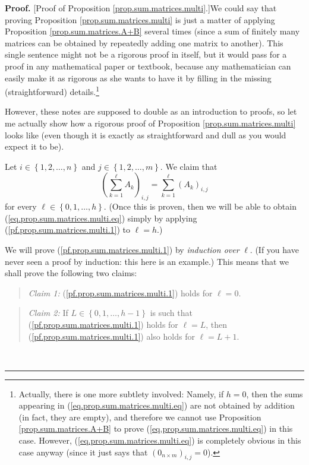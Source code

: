 \documentclass[numbers=enddot,12pt,final,onecolumn,notitlepage]{scrartcl}%
\theoremstyle{definition}
\newenvironment{statement}{\begin{quote}}{\end{quote}}
\newenvironment{proof}[1][Proof]{\noindent\textbf{#1.} }{\ \rule{0.5em}{0.5em}}
\let\sumnonlimits\sum
\renewcommand{\sum}{\sumnonlimits\limits}
\begin{document}
\begin{proof}
[Proof of Proposition \ref{prop.sum.matrices.multi}.]We could say that proving
Proposition \ref{prop.sum.matrices.multi} is just a matter of applying
Proposition \ref{prop.sum.matrices.A+B} several times (since a sum of finitely
many matrices can be obtained by repeatedly adding one matrix to another).
This single sentence might not be a rigorous proof in itself, but it would
pass for a proof in any mathematical paper or textbook, because any
mathematician can easily make it as rigorous as she wants to have it by
filling in the missing (straightforward) details.\footnote{Actually, there is
one more subtlety involved: Namely, if $h=0$, then the sums appearing in
(\ref{eq.prop.sum.matrices.multi.eq}) are not obtained by addition (in fact,
they are empty), and therefore we cannot use Proposition
\ref{prop.sum.matrices.A+B} to prove (\ref{eq.prop.sum.matrices.multi.eq}) in
this case. However, (\ref{eq.prop.sum.matrices.multi.eq}) is completely
obvious in this case anyway (since it just says that $\left(  0_{n\times
m}\right)  _{i,j}=0$).}

However, these notes are supposed to double as an introduction to proofs, so
let me actually show how a rigorous proof of Proposition
\ref{prop.sum.matrices.multi} looks like (even though it is exactly as
straightforward and dull as you would expect it to be).

Let $i\in\left\{  1,2,\ldots,n\right\}  $ and $j\in\left\{  1,2,\ldots
,m\right\}  $. We claim that%
\begin{equation}
\left(  \sum_{k=1}^{\ell}A_{k}\right)  _{i,j}=\sum_{k=1}^{\ell}\left(
A_{k}\right)  _{i,j} \label{pf.prop.sum.matrices.multi.1}%
\end{equation}
for every $\ell\in\left\{  0,1,\ldots,h\right\}  $. (Once this is proven, then
we will be able to obtain (\ref{eq.prop.sum.matrices.multi.eq}) simply by
applying (\ref{pf.prop.sum.matrices.multi.1}) to $\ell=h$.)

We will prove (\ref{pf.prop.sum.matrices.multi.1}) by \textit{induction over
}$\ell$. (If you have never seen a proof by induction: this here is an
example.) This means that we shall prove the following two claims:

\begin{statement}
\textit{Claim 1:} (\ref{pf.prop.sum.matrices.multi.1}) holds for $\ell=0$.
\end{statement}

\begin{statement}
\textit{Claim 2:} If $L\in\left\{  0,1,\ldots,h-1\right\}  $ is such that
(\ref{pf.prop.sum.matrices.multi.1}) holds for $\ell=L$, then
(\ref{pf.prop.sum.matrices.multi.1}) also holds for $\ell=L+1$.
\end{statement}


\end{proof}
\end{document}
